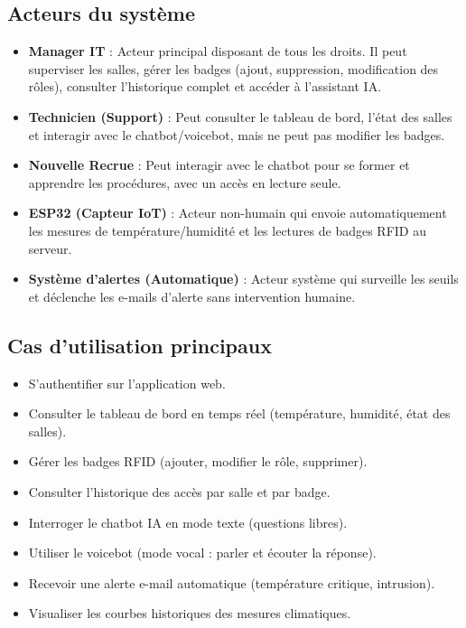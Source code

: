 \documentclass[12pt,a4paper]{report}
\begin{document}
\subsection{Acteurs du système}
\begin{itemize}
    \item \textbf{Manager IT} : Acteur principal disposant de tous les droits. Il peut superviser les salles, gérer les badges (ajout, suppression, modification des rôles), consulter l'historique complet et accéder à l'assistant IA.
    \item \textbf{Technicien (Support)} : Peut consulter le tableau de bord, l'état des salles et interagir avec le chatbot/voicebot, mais ne peut pas modifier les badges.
    \item \textbf{Nouvelle Recrue} : Peut interagir avec le chatbot pour se former et apprendre les procédures, avec un accès en lecture seule.
    \item \textbf{ESP32 (Capteur IoT)} : Acteur non-humain qui envoie automatiquement les mesures de température/humidité et les lectures de badges RFID au serveur.
    \item \textbf{Système d'alertes (Automatique)} : Acteur système qui surveille les seuils et déclenche les e-mails d'alerte sans intervention humaine.
\end{itemize}

\subsection{Cas d'utilisation principaux}
\begin{itemize}
    \item S'authentifier sur l'application web.
    \item Consulter le tableau de bord en temps réel (température, humidité, état des salles).
    \item Gérer les badges RFID (ajouter, modifier le rôle, supprimer).
    \item Consulter l'historique des accès par salle et par badge.
    \item Interroger le chatbot IA en mode texte (questions libres).
    \item Utiliser le voicebot (mode vocal : parler et écouter la réponse).
    \item Recevoir une alerte e-mail automatique (température critique, intrusion).
    \item Visualiser les courbes historiques des mesures climatiques.
\end{itemize}
\end{document}
